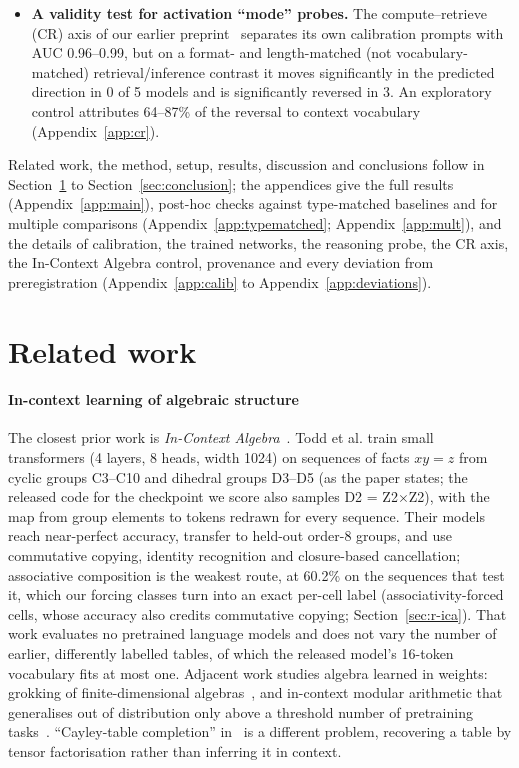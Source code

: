 \documentclass[11pt]{article}
\begin{document}
\begin{itemize}
  \item \textbf{A validity test for activation ``mode'' probes.} The compute--retrieve (CR) axis of our earlier preprint~\cite{ramdan2026cr} separates its own calibration prompts with AUC 0.96--0.99, but on a format- and length-matched (not vocabulary-matched) retrieval/inference contrast it moves significantly in the predicted direction in 0 of 5 models and is significantly reversed in 3. An exploratory control attributes 64--87\% of the reversal to context vocabulary (Appendix~\ref{app:cr}).
\end{itemize}

Related work, the method, setup, results, discussion and conclusions follow in Section~\ref{sec:related} to Section~\ref{sec:conclusion}; the appendices give the full results (Appendix~\ref{app:main}), post-hoc checks against type-matched baselines and for multiple comparisons (Appendix~\ref{app:typematched}; Appendix~\ref{app:mult}), and the details of calibration, the trained networks, the reasoning probe, the CR axis, the In-Context Algebra control, provenance and every deviation from preregistration (Appendix~\ref{app:calib} to Appendix~\ref{app:deviations}).

\section{Related work}\label{sec:related}

\paragraph{In-context learning of algebraic structure}

The closest prior work is \emph{In-Context Algebra}~\cite{todd2026ica}. Todd et al. train small transformers (4 layers, 8 heads, width 1024) on sequences of facts $xy = z$ from cyclic groups C3--C10 and dihedral groups D3--D5 (as the paper states; the released code for the checkpoint we score also samples D2 = Z2$\times$Z2), with the map from group elements to tokens redrawn for every sequence. Their models reach near-perfect accuracy, transfer to held-out order-8 groups, and use commutative copying, identity recognition and closure-based cancellation; associative composition is the weakest route, at 60.2\% on the sequences that test it, which our forcing classes turn into an exact per-cell label (associativity-forced cells, whose accuracy also credits commutative copying; Section~\ref{sec:r-ica}). That work evaluates no pretrained language models and does not vary the number of earlier, differently labelled tables, of which the released model's 16-token vocabulary fits at most one. Adjacent work studies algebra learned in weights: grokking of finite-dimensional algebras~\cite{notsawo2026grokking}, and in-context modular arithmetic that generalises out of distribution only above a threshold number of pretraining tasks~\cite{he2024grok}. ``Cayley-table completion'' in~\cite{huh2025algebraic,huh2026cayley} is a different problem, recovering a table by tensor factorisation rather than inferring it in context.
\end{document}
